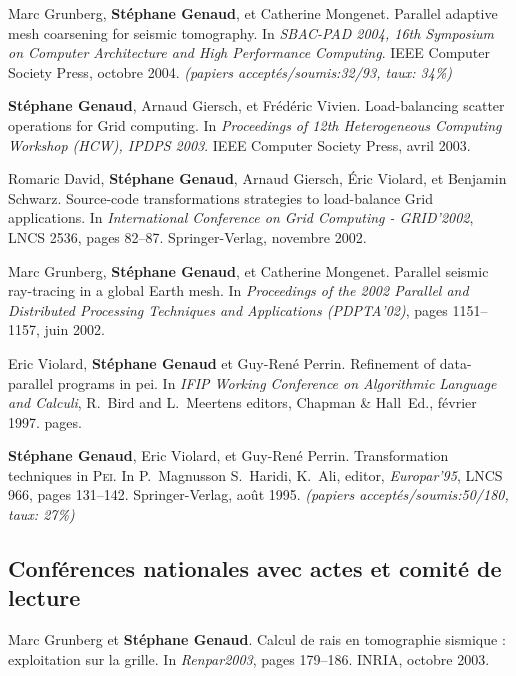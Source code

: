 \documentclass[11pt]{article}
\begin{document}
\begin{thebibliography}{99}
Marc Grunberg, \textbf{Stéphane Genaud}, et Catherine Mongenet.
\newblock Parallel adaptive mesh coarsening for seismic tomography.
\newblock In {\em SBAC-PAD 2004, 16th Symposium on Computer Architecture and
  High Performance Computing}. IEEE Computer Society Press, octobre 2004.
\newblock \small{\textit{(papiers acceptés/soumis:32/93, taux: 34\%)}}

\textbf{Stéphane Genaud}, Arnaud Giersch, et Frédéric Vivien.
\newblock Load-balancing scatter operations for Grid computing.
\newblock In {\em Proceedings of 12th Heterogeneous Computing Workshop 
(HCW), IPDPS 2003}. IEEE Computer Society Press, avril 2003.

Romaric David, \textbf{Stéphane Genaud}, Arnaud Giersch, \'{E}ric Violard, et 
  Benjamin Schwarz.
\newblock Source-code transformations strategies to load-balance Grid
  applications.
\newblock In {\em International Conference on Grid Computing - GRID'2002}, 
LNCS 2536, pages 82--87. Springer-Verlag, novembre 2002.

Marc Grunberg, \textbf{Stéphane Genaud}, et Catherine Mongenet.
\newblock Parallel seismic ray-tracing in a global {E}arth mesh.
\newblock In {\em Proceedings of the 2002 Parallel and Distributed Processing
  Techniques and Applications (PDPTA'02)}, pages 1151--1157, juin 2002.

Eric Violard, \textbf{Stéphane Genaud} et Guy-René Perrin.
\newblock Refinement of data-parallel programs in pei.
\newblock In {\em IFIP Working Conference on Algorithmic Language and Calculi}, 
R.~Bird and L.~Meertens editors, Chapman \& Hall~Ed., février 1997.
 pages.

\textbf{Stéphane Genaud}, Eric Violard, et Guy-René Perrin.
\newblock Transformation techniques in \textsc{Pei}.
\newblock In P.~Magnusson S.~Haridi, K.~Ali, editor, {\em Europar'95}, LNCS
  966, pages 131--142. Springer-Verlag, août 1995.
\newblock \small{\textit{(papiers acceptés/soumis:50/180, taux: 27\%)}}




\subsection*{Conférences nationales avec actes et comité de lecture}
Marc Grunberg et \textbf{Stéphane Genaud}.
\newblock Calcul de rais en tomographie sismique : exploitation sur la grille.
\newblock In {\em Renpar2003}, pages 179--186. INRIA, octobre 2003.


\end{thebibliography}
\end{document}
